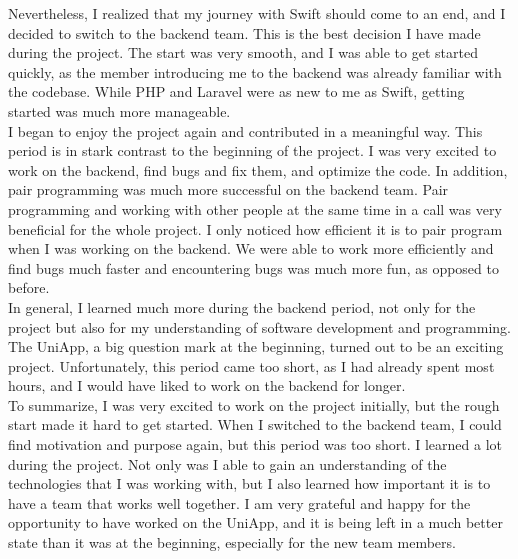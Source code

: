 \documentclass[sf-font,usefira,english]{uulm/sp/article}
\begin{document}
Nevertheless, I realized that my journey with Swift should come to an end, and I decided to switch to the backend team. 
This is the best decision I have made during the project. 
The start was very smooth, and I was able to get started quickly, as the member introducing me to the backend was already familiar with the codebase. 
While PHP and Laravel were as new to me as Swift, getting started was much more manageable.\\

I began to enjoy the project again and contributed in a meaningful way. 
This period is in stark contrast to the beginning of the project. 
I was very excited to work on the backend, find bugs and fix them, and optimize the code. 
In addition, pair programming was much more successful on the backend team. 
Pair programming and working with other people at the same time in a call was very beneficial for the whole project. 
I only noticed how efficient it is to pair program when I was working on the backend. 
We were able to work more efficiently and find bugs much faster and encountering bugs was much more fun, as opposed to before.\\

In general, I learned much more during the backend period, not only for the project but also for my understanding of software development and programming. 
The UniApp, a big question mark at the beginning, turned out to be an exciting project. 
Unfortunately, this period came too short, as I had already spent most hours, and I would have liked to work on the backend for longer.\\

To summarize, I was very excited to work on the project initially, but the rough start made it hard to get started. 
When I switched to the backend team, I could find motivation and purpose again, but this period was too short. 
I learned a lot during the project. 
Not only was I able to gain an understanding of the technologies that I was working with, but I also learned how important it is to have a team that works well together. 
I am very grateful and happy for the opportunity to have worked on the UniApp, and it is being left in a much better state than it was at the beginning, especially for the new team members.
\end{document}
